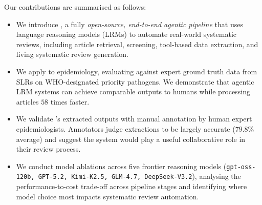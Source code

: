 Our contributions are summarised as follows:
\begin{itemize}

\item We introduce \textbf{\name{}}, a fully \textit{open-source, end-to-end agentic pipeline} that uses language reasoning models (LRMs) to automate real-world systematic reviews, including article retrieval, screening, tool-based data extraction, and living systematic review generation. 


\item We apply \name{} to epidemiology, evaluating against expert ground truth data from SLRs on WHO-designated priority pathogens. 
We demonstrate that agentic LRM systems can achieve comparable outputs to humans while processing articles $58$ times faster.

\item We validate \name{}'s extracted outputs with manual annotation by human expert epidemiologists. Annotators judge extractions to be largely accurate ($79.8\%$ average) and suggest the system would play a useful collaborative role in their review process.

\item We conduct model ablations across five frontier reasoning models (\texttt{gpt-oss-120b, GPT-5.2, Kimi-K2.5, GLM-4.7, DeepSeek-V3.2}), 
analysing the performance-to-cost trade-off across pipeline stages and identifying where model choice most impacts systematic review automation.
\end{itemize}


